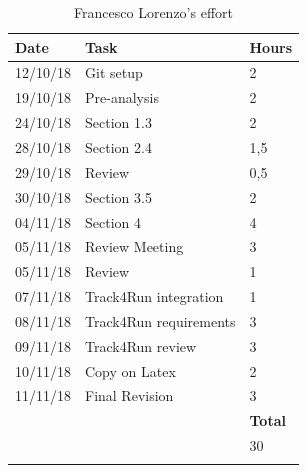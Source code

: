 \documentclass[titlepage]{article}
\begin{document}
	\begin{longtable}{| p{2 cm} | p{5 cm} | p{2 cm} |} 
		\hline
		{\bf Date} & {\bf Task} & {\bf Hours}\\
		\hline
		12/10/18 & Git setup & 2 \\
		19/10/18 & Pre-analysis & 2 \\
		24/10/18 & Section 1.3 & 2 \\
		28/10/18 & Section 2.4 & 1,5 \\
		29/10/18 & Review & 0,5 \\
		30/10/18 & Section 3.5 & 2 \\
		04/11/18 & Section 4 & 4 \\
		05/11/18 & Review Meeting & 3 \\
		05/11/18 & Review & 1\\
		07/11/18 & Track4Run integration & 1 \\
		08/11/18 & Track4Run requirements & 3 \\
		09/11/18 & Track4Run review & 3 \\
		10/11/18 & Copy on Latex & 2 \\
		11/11/18 & Final Revision & 3 \\
		\hline
		& & {\bf Total} \\
		\hline
		& & 30 \\
		\hline
		\caption{Francesco Lorenzo's effort}
	\end{longtable}

	
\end{document}

